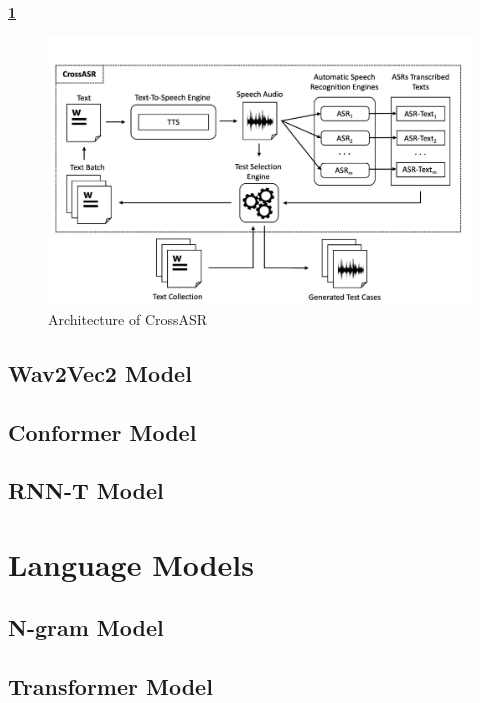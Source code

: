  \textbf{\ref{fig:Architecture-of-CrossASR}} 





\begin{figure}[!ht]
	\centering
	\includegraphics[width=0.8 \textwidth]{images/Architecture-of-CrossASR.png}\\
	\caption{Architecture of CrossASR}
    \caption*{\cite{asyrofi2020crossasr}}
	\label{fig:Architecture-of-CrossASR}
\end{figure}



\subsection{Wav2Vec2 Model}

\subsection{Conformer Model}
\subsection{RNN-T Model}

 



\section{Language Models}
\subsection{N-gram Model}
\subsection{Transformer Model}
